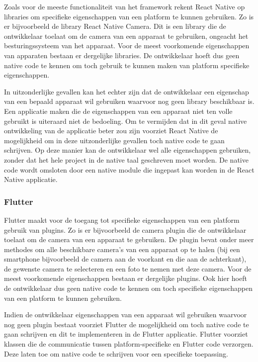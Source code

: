 Zoals voor de meeste functionaliteit van het framework rekent React Native op
libraries om specifieke eigenschappen van een platform te kunnen gebruiken. Zo
is er bijvoorbeeld de library React Native Camera. Dit is een library die de
ontwikkelaar toelaat om de camera van een apparaat te gebruiken, ongeacht het
besturingssysteem van het apparaat. Voor de meest voorkomende eigenschappen van
apparaten bestaan er dergelijke libraries. De ontwikkelaar hoeft dus geen native
code te kennen om toch gebruik te kunnen maken van platform specifieke
eigenschappen.

In uitzonderlijke gevallen kan het echter zijn dat de ontwikkelaar een
eigenschap van een bepaald apparaat wil gebruiken waarvoor nog geen library
beschikbaar is. Een applicatie maken die de eigenschappen van een apparaat niet
ten volle gebruikt is uiteraard niet de bedoeling. Om te vermijden dat in dit
geval native ontwikkeling van de applicatie beter zou zijn voorziet React Native
de mogelijkheid om in deze uitzonderlijke gevallen toch native code te gaan
schrijven. Op deze manier kan de ontwikkelaar wel alle eigenschappen gebruiken,
zonder dat het hele project in de native taal geschreven moet worden. De native code wordt omsloten door een native module die ingepast kan worden in de React Native applicatie.

\subsubsection{Flutter}
\label{subsubsec:nativeAPIFlutter}

Flutter maakt voor de toegang tot specifieke eigenschappen van een platform
gebruik van plugins. Zo is er bijvoorbeeld de camera plugin die de ontwikkelaar
toelaat om de camera van een apparaat te gebruiken. De plugin bevat onder meer
methodes om alle beschikbare camera's van een apparaat op te halen (bij een
smartphone bijvoorbeeld de camera aan de voorkant en die aan de achterkant), de
gewenste camera te selecteren en een foto te nemen met deze camera. Voor de
meest voorkomende eigenschappen bestaan er dergelijke plugins. Ook hier hoeft de
ontwikkelaar dus geen native code te kennen om toch specifieke eigenschappen van
een platform te kunnen gebruiken.

Indien de ontwikkelaar eigenschappen van een apparaat wil gebruiken waarvoor nog geen plugin bestaat voorziet Flutter de mogelijkheid om toch native code te gaan schrijven en dit te implementeren in de Flutter applicatie. Flutter voorziet klassen die de communicatie tussen platform-specifieke en Flutter code verzorgen. Deze laten toe om native code te schrijven voor een specifieke toepassing.

